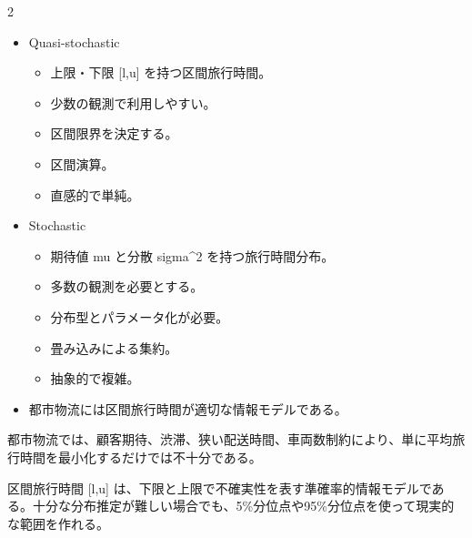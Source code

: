 \clearpage
{}
\begin{multicols}{2}\footnotesize\raggedcolumns
{}
\begin{itemize}
\item Quasi-stochastic
\begin{itemize}
\item 上限・下限 [l,u] を持つ区間旅行時間。
\item 少数の観測で利用しやすい。
\item 区間限界を決定する。
\item 区間演算。
\item 直感的で単純。
\end{itemize}
\item Stochastic
\begin{itemize}
\item 期待値 mu と分散 sigma\textasciicircum{}2 を持つ旅行時間分布。
\item 多数の観測を必要とする。
\item 分布型とパラメータ化が必要。
\item 畳み込みによる集約。
\item 抽象的で複雑。
\end{itemize}
\item 都市物流には区間旅行時間が適切な情報モデルである。
\end{itemize}
都市物流では、顧客期待、渋滞、狭い配送時間、車両数制約により、単に平均旅行時間を最小化するだけでは不十分である。\par

区間旅行時間 [l,u] は、下限と上限で不確実性を表す準確率的情報モデルである。十分な分布推定が難しい場合でも、5\%分位点や95\%分位点を使って現実的な範囲を作れる。\par


\end{multicols}
